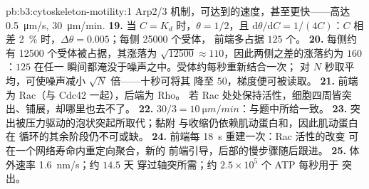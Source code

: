 \begin{solution}{pb:b3:cytoskeleton-motility:1}
Arp2/3 机制，可达到的速度，甚至更快——高达
\qty{0.5}{\micro m/s}, \qty{30}{\micro m/min}.
\textbf{19.} 当 $C = K_{d}$ 时，$\theta = 1/2$，且 $\mathrm{d}\theta/
\mathrm{d}C = 1/(4C)$：$C$ 相差 \qty{2}{\%} 时，$\Delta\theta
= 0.005$；每侧 \num{25000} 个受体，
前端多占据 $125$ 个。
\textbf{20.} 每侧约有 \num{12500} 个受体被占据，其涨落为
$\sqrt{\num{12500}} \approx 110$，因此两侧之差的涨落约为
$160$：$125$ 在任一
瞬间都淹没于噪声之中。受体约每秒重新结合一次；
对 $N$ 秒取平均，可使噪声减小 $\sqrt{N}$ 倍——十秒可将其
降至 $50$，梯度便可被读取。
\textbf{21.} 前端为 Rac（与 Cdc42 一起），后端为 Rho。
若 Rac 处处保持活性，细胞四周皆突出、铺展，却哪里也去不了。
\textbf{22.} $30/3 = \qty{10}{\micro m/min}$：与题中所给一致。
\textbf{23.} 突出被压力驱动的泡状突起所取代；黏附
与收缩仍依赖肌动蛋白和，因此肌动蛋白在
循环的其余阶段仍不可或缺。
\textbf{24.} 前端每 \qty{18}{s} 重建一次：Rac 活性的改变
可在一个网络寿命内重定向聚合，新的
前端引导，后部的慢步骤随后跟进。
\textbf{25.} 体外速率 \qty{1.6}{nm/s}；约 $14.5$ 天
穿过轴突所需；约 $2.5\times 10^{5}$ 个 ATP 每秒用于
突出。
\end{solution}
